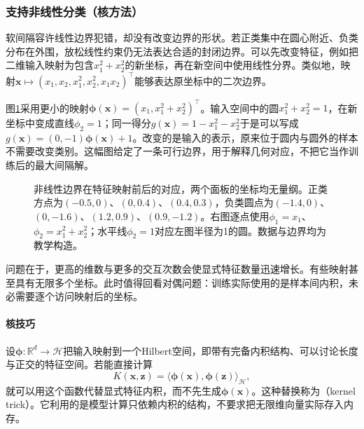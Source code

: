 \subsubsection{支持非线性分类（核方法）}
\label{sec:classification-svm-kernels}

软间隔容许线性边界犯错，却没有改变边界的形状。若正类集中在圆心附近、负类分布在外围，放松线性约束仍无法表达合适的封闭边界。可以先改变特征，例如把二维输入映射为包含$x_1^2+x_2^2$的新坐标，再在新空间中使用线性分界。类似地，映射$\bm{x}\mapsto(x_1,x_2,x_1^2,x_2^2,x_1x_2)^{\top}$能够表达原坐标中的二次边界。

图\ref{fig:classification-kernel-map}采用更小的映射$\bm{\phi}(\bm{x})=(x_1,x_1^2+x_2^2)^{\top}$。输入空间中的圆$x_1^2+x_2^2=1$，在新坐标中变成直线$\phi_2=1$；同一得分$g(\bm{x})=1-x_1^2-x_2^2$于是可以写成$g(\bm{x})=(0,-1)\bm{\phi}(\bm{x})+1$。改变的是输入的表示，原来位于圆内与圆外的样本不需要改变类别。这幅图给定了一条可行边界，用于解释几何对应，不把它当作训练后的最大间隔解。

\begin{figure}[htbp]
  \centering
  
  \caption{非线性边界在特征映射前后的对应，两个面板的坐标均无量纲。正类方点为$(-0.5,0)$、$(0,0.4)$、$(0.4,0.3)$，负类圆点为$(-1.4,0)$、$(0,-1.6)$、$(1.2,0.9)$、$(0.9,-1.2)$。右图逐点使用$\phi_1=x_1$、$\phi_2=x_1^2+x_2^2$；水平线$\phi_2=1$对应左图半径为1的圆。数据与边界均为教学构造。}
  \label{fig:classification-kernel-map}
\end{figure}

问题在于，更高的维数与更多的交互次数会使显式特征数量迅速增长。有些映射甚至具有无限多个坐标。此时值得回看对偶问题：训练实际使用的是样本间内积，未必需要逐个访问映射后的坐标。

\paragraph{核技巧}
\label{sec:classification-svm-kernel-trick}

设$\bm{\phi}:\mathbb{R}^d\to\mathcal{H}$把输入映射到一个Hilbert空间，即带有完备内积结构、可以讨论长度与正交的特征空间。若能直接计算
\begin{equation}
  K(\bm{x},\bm{z})
  =\langle\bm{\phi}(\bm{x}),\bm{\phi}(\bm{z})\rangle_{\mathcal{H}},
  \label{eq:classification-svm-kernel-inner-product}
\end{equation}
就可以用这个函数代替显式特征内积，而不先生成$\bm{\phi}(\bm{x})$。这种替换称为（kernel trick）。它利用的是模型计算只依赖内积的结构，不要求把无限维向量实际存入内存。


